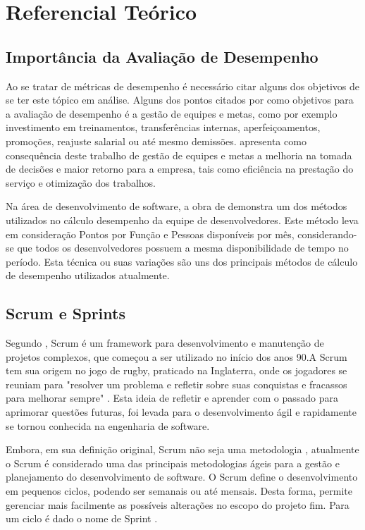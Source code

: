 \section{Referencial Teórico}

\subsection{ Importância da Avaliação de Desempenho}
Ao se tratar de métricas de desempenho é necessário citar alguns dos objetivos de se ter este tópico em análise. Alguns dos pontos citados por  como objetivos para a avaliação de desempenho é a gestão de equipes e metas, como por exemplo investimento em treinamentos, transferências internas, aperfeiçoamentos, promoções, reajuste salarial ou até mesmo demissões.  apresenta como consequência deste trabalho de gestão de equipes e metas a melhoria na tomada de decisões e maior retorno para a empresa, tais como eficiência na prestação do serviço e otimização dos trabalhos.\par
Na área de desenvolvimento de software, a obra de  demonstra um dos métodos utilizados no cálculo desempenho da equipe de desenvolvedores. Este método leva em consideração Pontos por Função e Pessoas disponíveis por mês, considerando-se que todos os desenvolvedores possuem a mesma disponibilidade de tempo no período. Esta técnica ou suas variações são uns dos principais métodos de cálculo de desempenho utilizados atualmente.

\subsection{Scrum e Sprints}
Segundo \citeauthor{scrumguide}, Scrum é um framework para desenvolvimento e manutenção de projetos complexos, que começou a ser utilizado no início dos anos 90.A Scrum tem sua origem no jogo de rugby, praticado na Inglaterra, onde os jogadores se reuniam para "resolver um problema e refletir sobre suas conquistas e fracassos para melhorar sempre" \cite{scrumatlassian}. Esta ideia de refletir e aprender com o passado para aprimorar questões futuras, foi levada para o desenvolvimento ágil e rapidamente se tornou conhecida na engenharia de software.\par 

Embora, em sua definição original, Scrum não seja uma metodologia \cite{scrumguide}, atualmente o Scrum é considerado uma das principais metodologias ágeis para a gestão e planejamento do desenvolvimento de software. O Scrum define o desenvolvimento em pequenos ciclos, podendo ser semanais ou até mensais. Desta forma, permite gerenciar mais facilmente as possíveis alterações no escopo do projeto fim. Para um ciclo é dado o nome de Sprint \cite{scrum}.\par

